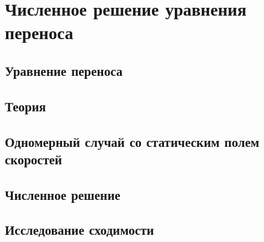 \documentclass[10pt,a4paper]{article}
\begin{document}
\section{Численное решение уравнения переноса}
\subsection{Уравнение переноса}
\subsection{Теория}
\subsection{Одномерный случай со статическим полем скоростей}
\subsection{Численное решение}
\subsection{Исследование сходимости}
\end{document}
